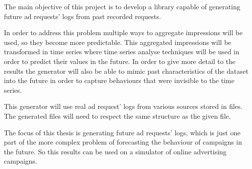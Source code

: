 The main objective of this project is to develop a library capable of generating
future ad requests' logs from past recorded requests.

In order to address this problem multiple ways to aggregate impressions
will be used,
so they become more predictable. This aggregated impressions will be transformed in time
series where time series analyse techniques will be used in order to predict
their values in the future.
In order to give more detail to the results the generator will also be able to
mimic past characteristics of the dataset into the future in order to capture
behaviours that were invisible to the time series.

This generator will use real ad request' logs from various sources stored in files.
The generated files will need to respect the same structure as the given file.

The focus of this thesis is generating future ad requests' logs, which is just
one part of the more complex problem of
forecasting the behaviour of campaigns in the future. So this results can be
used on a simulator of online advertising campaigns.




